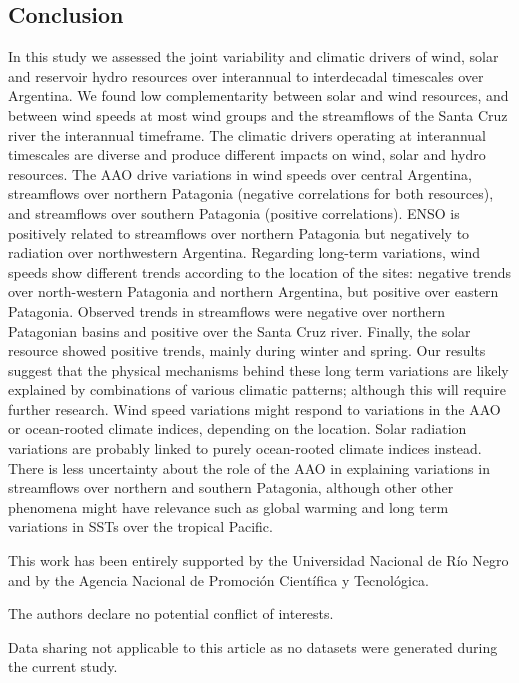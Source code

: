 \documentclass[AMA,Times1COL]{WileyNJDv5} %
\begin{document}
\begin{linenumbers}
\section{Conclusion}

In this study we assessed the joint variability and climatic drivers of wind, solar and reservoir hydro resources over interannual to interdecadal timescales over Argentina. We found low complementarity between solar and wind resources, and between wind speeds at most wind groups and the streamflows of the Santa Cruz river the interannual timeframe. The climatic drivers operating at interannual timescales are diverse and produce different impacts on wind, solar and hydro resources. The AAO drive variations in wind speeds over central Argentina, streamflows over northern Patagonia (negative correlations for both resources), and streamflows over southern Patagonia (positive correlations). ENSO is positively related to streamflows over northern Patagonia but negatively to radiation over northwestern Argentina. Regarding long-term variations, wind speeds show different trends according to the location of the sites: negative trends over north-western Patagonia and northern Argentina, but positive over eastern Patagonia. Observed trends in streamflows were negative over northern Patagonian basins and positive over the Santa Cruz river. Finally, the solar resource showed positive trends, mainly during winter and spring. Our results suggest that the physical mechanisms behind these long term variations are likely explained by combinations of various climatic patterns; although this will require further research. Wind speed variations might respond to variations in the AAO or ocean-rooted climate indices, depending on the location. Solar radiation variations are probably linked to purely ocean-rooted climate indices instead. There is less uncertainty about the role of the AAO in explaining variations in streamflows over northern and southern Patagonia, although other other phenomena might have relevance such as global warming and long term variations in SSTs over the tropical Pacific. 



This work has been entirely supported by the Universidad Nacional de Río Negro and by the Agencia Nacional de Promoción Científica y Tecnológica. 



The authors declare no potential conflict of interests.


Data sharing not applicable to this article as no datasets were generated during the current study.



\end{linenumbers}
\end{document}

